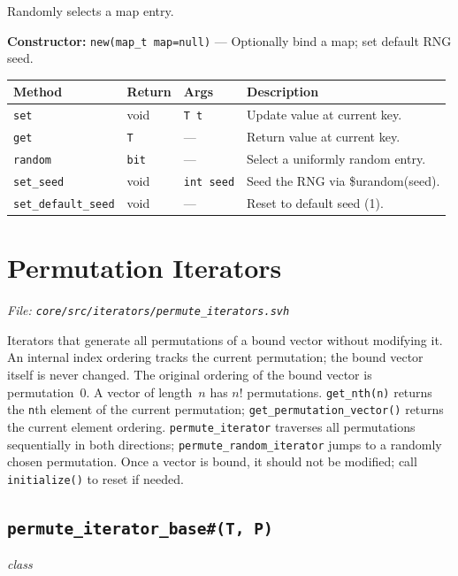 \documentclass[11pt,letterpaper]{report}
\begin{document}
Randomly selects a map entry.

\noindent\textbf{Constructor:} \texttt{new(map\_t map=null)} --- Optionally bind a map; set default RNG seed.

\begin{xltabular}{\linewidth}{>{\small}p{1.35in} >{\small}p{1.25in} >{\small}p{0.95in} >{\small}X}
\toprule
\textbf{Method} & \textbf{Return} & \textbf{Args} & \textbf{Description} \\
\midrule
\endhead
\bottomrule
\endfoot
\texttt{set} & void & \texttt{T t} & Update value at current key. \\
\texttt{get} & \texttt{T} & --- & Return value at current key. \\
\texttt{random} & \texttt{bit} & --- & Select a uniformly random entry. \\
\texttt{set\_seed} & void & \texttt{int seed} & Seed the RNG via \$urandom(seed). \\
\texttt{set\_default\_seed} & void & --- & Reset to default seed (1). \\
\end{xltabular}

\section{Permutation Iterators}
\noindent\small\textit{File: \texttt{core/src/iterators/permute\_iterators.svh}}\par

Iterators that generate all permutations of a bound vector without modifying it. An internal index ordering tracks the current permutation; the bound vector itself is never changed. The original ordering of the bound vector is permutation~0. A vector of length~$n$ has $n!$ permutations. \texttt{get\_nth(n)} returns the \texttt{n}th element of the current permutation; \texttt{get\_permutation\_vector()} returns the current element ordering. \texttt{permute\_iterator} traverses all permutations sequentially in both directions; \texttt{permute\_random\_iterator} jumps to a randomly chosen permutation. Once a vector is bound, it should not be modified; call \texttt{initialize()} to reset if needed.

\subsection*{\texttt{permute\_iterator\_base\#(T, P)}}
\noindent\small\textit{class}\par
\end{document}
